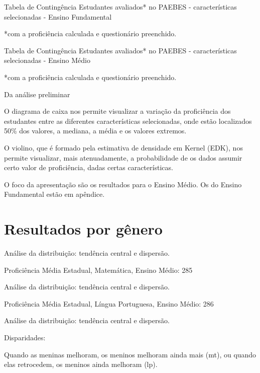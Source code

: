\documentclass[
  ignorenonframetext,
]{beamer}
\begin{document}
\begin{frame}{Tabela de Contingência}
\protect\hypertarget{tabela-de-continguxeancia-2}{}
Estudantes avaliados* no PAEBES - características selecionadas - Ensino
Fundamental

*com a proficiência calculada e questionário preenchido.
\end{frame}

\begin{frame}{Tabela de Contingência}
\protect\hypertarget{tabela-de-continguxeancia-3}{}
Estudantes avaliados* no PAEBES - características selecionadas - Ensino
Médio

*com a proficiência calculada e questionário preenchido.
\end{frame}

\begin{frame}
Da análise preliminar

O diagrama de caixa nos permite visualizar a variação da proficiência
dos estudantes entre as diferentes características selecionadas, onde
estão localizados 50\% dos valores, a mediana, a média e os valores
extremos.

O violino, que é formado pela estimativa de densidade em Kernel (EDK),
nos permite visualizar, mais atenuadamente, a probabilidade de os dados
assumir certo valor de proficiência, dadas certas características.

O foco da apresentação são os resultados para o Ensino Médio. Os do
Ensino Fundamental estão em apêndice.
\end{frame}

\hypertarget{resultados-por-guxeanero}{%
\section{Resultados por gênero}\label{resultados-por-guxeanero}}

\begin{frame}
Análise da distribuição: tendência central e dispersão.

Proficiência Média Estadual, Matemática, Ensino Médio: 285
\end{frame}

\begin{frame}
Análise da distribuição: tendência central e dispersão.

Proficiência Média Estadual, Língua Portuguesa, Ensino Médio: 286
\end{frame}

\begin{frame}
Análise da distribuição: tendência central e dispersão.

Disparidades:

Quando as meninas melhoram, os meninos melhoram ainda mais (mt), ou
quando elas retrocedem, os meninos ainda melhoram (lp).
\end{frame}
\end{document}
